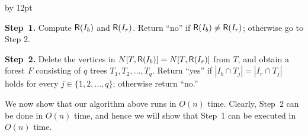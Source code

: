 \documentclass{llncs}
\newcommand{\msize}[1]{{\left|#1\right|}}
\newcommand{\Neiclosed}[2]{N[#1, #2]}
\newcommand{\bfI}{I}
\newcommand{\ImSet}[1]{{\sf R}(\bfI_{#1})}
\newcommand{\Forest}{F}
\newcommand{\numq}{q}
\newenvironment{listing}[1]{\begin{list}{*}{\settowidth{\labelwidth}{#1}\setlength{\leftmargin}{\labelwidth}\advance \leftmargin by 12pt
\setlength{\itemsep}{0pt}\setlength{\parsep}{0pt}\setlength{\topsep}{0pt}\setlength{\parskip}{0pt}}}{\end{list}}
\newcounter{one}
\begin{document}
	\begin{listing}{{\bf Step~2.}}
	\item[{\bf Step~1.}] Compute $\ImSet{b}$ and $\ImSet{r}$.
								Return ``no'' if $\ImSet{b} \neq \ImSet{r}$; otherwise go to Step 2.
\smallskip

	\item[{\bf Step~2.}] Delete the vertices in $\Neiclosed{T}{\ImSet{b}} = \Neiclosed{T}{\ImSet{r}}$ from $T$, and obtain a forest $\Forest$ consisting of $\numq$ trees $T_1, T_2, \ldots, T_{\numq}$. 
								Return ``yes'' if $\msize{\bfI_b \cap T_j} = \msize{\bfI_r \cap T_j}$ holds for every $j \in \{1, 2, \ldots, \numq \}$; otherwise return ``no.''
	\end{listing}
\smallskip

	We now show that our algorithm above runs in $O(n)$ time. 
	Clearly, Step~2 can be done in $O(n)$ time, and hence we will show that Step~1 can be executed in $O(n)$ time.
\smallskip
	
\end{document}
